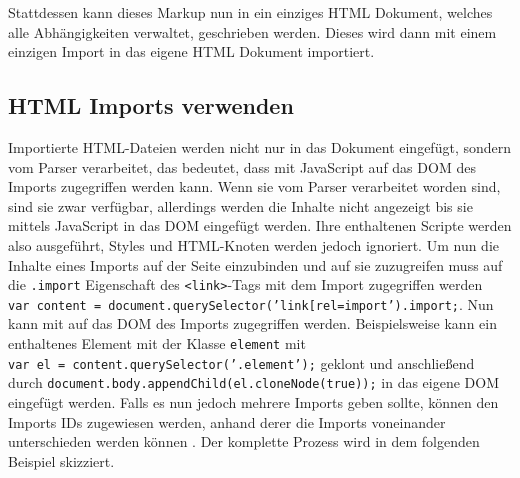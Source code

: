 Stattdessen kann dieses Markup nun in ein einziges HTML Dokument, welches alle Abhängigkeiten verwaltet, geschrieben werden. Dieses wird dann mit einem einzigen Import in das eigene HTML Dokument importiert.

\begin{Shaded}
\begin{Highlighting}[]
  \KeywordTok{>}
\end{Highlighting}
\end{Shaded}


\subsection{HTML Imports verwenden}\label{html-imports-verwenden}

Importierte HTML-Dateien werden nicht nur in das Dokument eingefügt, sondern vom Parser verarbeitet, das bedeutet, dass mit JavaScript auf das DOM des Imports zugegriffen werden kann. Wenn sie vom Parser verarbeitet worden sind, sind sie zwar verfügbar, allerdings werden die Inhalte nicht angezeigt bis sie mittels JavaScript in das DOM eingefügt werden. Ihre enthaltenen Scripte werden also ausgeführt, Styles und HTML-Knoten werden jedoch ignoriert. Um nun die Inhalte eines Imports auf der Seite einzubinden und auf sie zuzugreifen muss auf die \texttt{.import} Eigenschaft des \texttt{\textless{}link\textgreater{}}-Tags mit dem Import zugegriffen werden \texttt{var\ content\ =\ document.querySelector('link{[}rel=\dq import\dq{]}').import;}. Nun kann mit auf das DOM des Imports zugegriffen werden. Beispielsweise kann ein enthaltenes Element mit der Klasse \texttt{element} mit \texttt{var\ el\ =\ content.querySelector('.element');} geklont und anschließend durch \texttt{document.body.appendChild(el.cloneNode(true));} in das eigene DOM eingefügt werden. Falls es nun jedoch mehrere Imports geben sollte, können den Imports IDs zugewiesen werden, anhand derer die Imports voneinander unterschieden werden können \cite{citeulike:13853724}. Der komplette Prozess wird in dem folgenden Beispiel skizziert.

